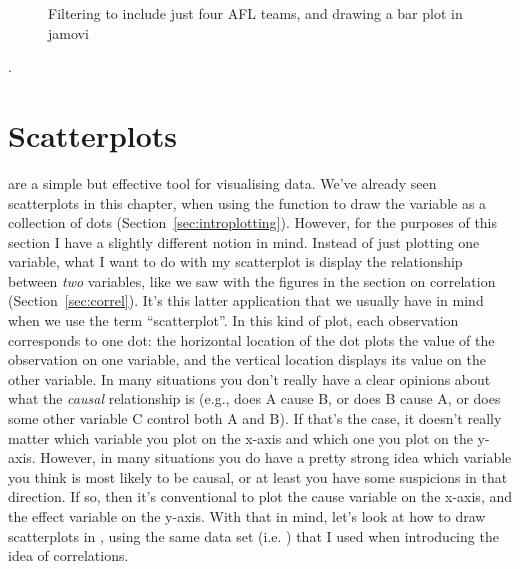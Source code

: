 \begin{figure}[h]
\begin{center}
\caption{Filtering to include just four AFL teams, and drawing a bar plot in jamovi}
\label{fig:bar1}
\HR
\end{center}
\end{figure}. 






\iffalse %

\section{Scatterplots\label{sec:scatterplots}}

 are a simple but effective tool for visualising data. We've already seen scatterplots in this chapter, when using the  function to draw the  variable as a collection of dots (Section~\ref{sec:introplotting}). However, for the purposes of this section I have a slightly different notion in mind. Instead of just plotting one variable, what I want to do with my scatterplot is display the relationship between {\it two} variables, like we saw with the figures in the section on correlation (Section~\ref{sec:correl}). It's this latter application that we usually have in mind when we use the term ``scatterplot''. In this kind of plot, each observation corresponds to one dot: the horizontal location of the dot plots the value of the observation on one variable, and the vertical location displays its value on the other variable. In many situations you don't really have a clear opinions about what the {\it causal} relationship is (e.g., does A cause B, or does B cause A, or does some other variable C control both A and B). If that's the case, it doesn't really matter which variable you plot on the x-axis and which one you plot on the y-axis. However, in many situations you do have a pretty strong idea which variable you think is most likely to be causal, or at least you have some suspicions in that direction. If so, then it's conventional to plot the cause variable on the x-axis, and the effect variable on the y-axis. With that in mind, let's look at how to draw scatterplots in \R, using the same  data set (i.e. ) that I used when introducing the idea of correlations.

